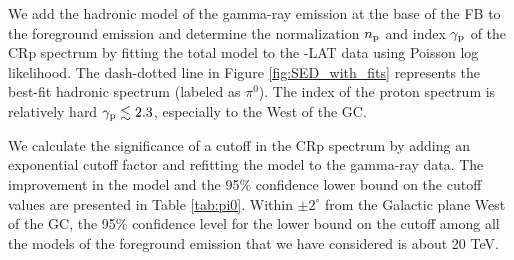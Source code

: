 We add the hadronic model of the gamma-ray emission at the base of the FB to the foreground emission 
and determine the normalization $n_{\text{p}}$ and index $\gamma_{\text{p}}$ of the CRp spectrum
by fitting the total model to the \Fermi-LAT data using Poisson log likelihood.
The dash-dotted line in Figure \ref{fig:SED_with_fits} represents the best-fit hadronic spectrum (labeled as $\pi^0$). 
The index of the proton spectrum is relatively hard $\gamma_{\text{p}} \lesssim 2.3$, especially to the West of the GC.

We calculate the significance of a cutoff in the CRp spectrum by adding an exponential cutoff factor and refitting the model to the gamma-ray data.
The improvement in the model and the 95\% confidence lower bound on the cutoff values are presented in Table \ref{tab:pi0}.
Within $\pm 2^\circ$ from the Galactic plane West of the GC, the 95\% confidence level for the lower bound on the cutoff among all the models
of the foreground emission that we have considered is about 20 TeV.


